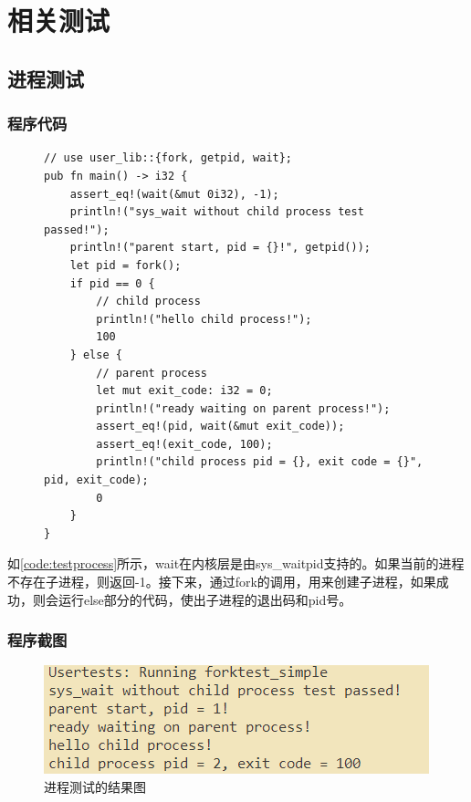 \chapter{相关测试}\label{chap:test}

\section{进程测试}
\subsection{程序代码}
\begin{figure}[h]
\begin{lstlisting}[caption=用户态进程创建的测试代码, label=code:testprocess]
// use user_lib::{fork, getpid, wait};
pub fn main() -> i32 {
    assert_eq!(wait(&mut 0i32), -1);
    println!("sys_wait without child process test passed!");
    println!("parent start, pid = {}!", getpid());
    let pid = fork();
    if pid == 0 {
        // child process
        println!("hello child process!");
        100
    } else {
        // parent process
        let mut exit_code: i32 = 0;
        println!("ready waiting on parent process!");
        assert_eq!(pid, wait(&mut exit_code));
        assert_eq!(exit_code, 100);
        println!("child process pid = {}, exit code = {}", pid, exit_code);
        0
    }
}
\end{lstlisting}
\end{figure}

如\autoref{code:testprocess}所示，wait在内核层是由sys\_waitpid支持的。如果当前的进程不存在子进程，则返回-1。接下来，通过fork的调用，用来创建子进程，如果成功，则会运行else部分的代码，使出子进程的退出码和pid号。 
\subsection{程序截图}

\begin{figure}[htb]
    \figureCapSet
    \centering
    \includegraphics[scale=0.5]{figure/c5/processtestresult.png}
    \caption{进程测试的结果图}
    \label{figure:c5processtestresult}
\end{figure}

